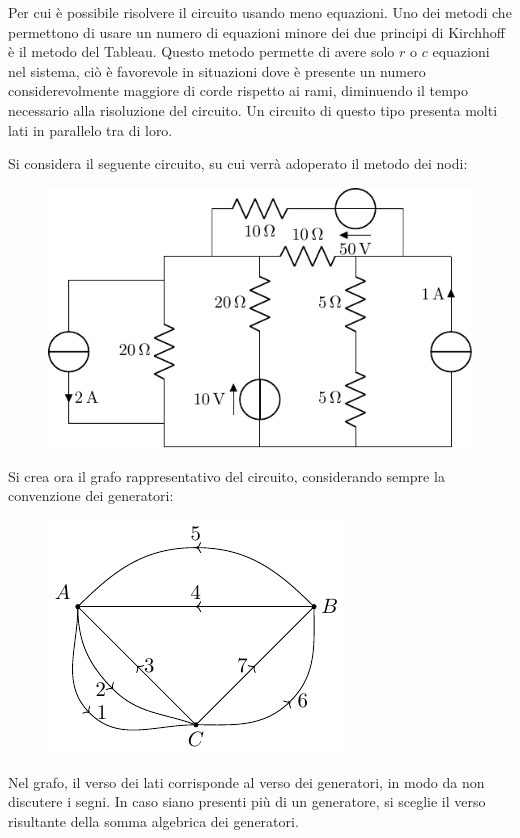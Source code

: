 \documentclass{article}
\numberwithin{equation}{subsection}
\begin{document}
Per cui è possibile risolvere il circuito usando meno equazioni. Uno dei metodi che permettono di usare un numero di equazioni minore dei due principi di Kirchhoff è il metodo 
del Tableau. Questo metodo permette di avere solo $r$ o $c$ equazioni nel sistema, ciò è favorevole in situazioni dove è presente un numero considerevolmente maggiore di 
corde rispetto ai rami, diminuendo il tempo necessario alla risoluzione del circuito. Un circuito di questo tipo presenta molti lati in parallelo tra di loro. 

Si considera il seguente circuito, su cui verrà adoperato il metodo dei nodi:
\begin{figure}[H]%
    \centering
    \includegraphics{circuito-1.pdf}%
    \label{fig:circuito-1}
\end{figure}
Si crea ora il grafo rappresentativo del circuito, considerando sempre la convenzione dei generatori: 
\begin{figure}[H]%
    \centering
    \includegraphics{grafo-circuito-1.pdf}%
    \label{fig:grafo-circuito-1}
\end{figure}

Nel grafo, il verso dei lati corrisponde al verso dei generatori, in modo da non discutere i segni. In caso siano presenti più di un generatore, si sceglie il verso risultante 
della somma algebrica dei generatori. 
\end{document}
